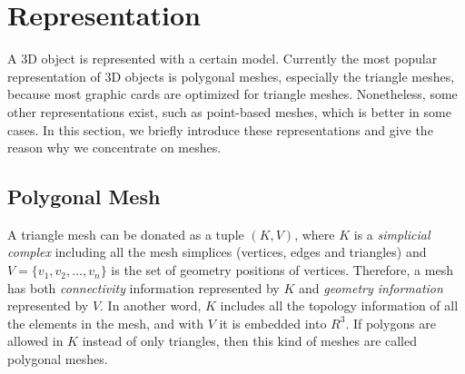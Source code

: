 \documentclass[11pt, a4paper]{report}
\begin{document}
    \section{Representation}
    \label{s:intro:representation}
    A 3D object is represented with a certain model.
    Currently the most popular representation of 3D objects is polygonal meshes, 
    especially the triangle meshes, because most graphic cards are optimized for triangle meshes. 
    Nonetheless, some other representations exist, 
    such as point-based meshes, which is better in some cases.
    In this section, we briefly introduce these representations and give the reason
    why we concentrate on meshes.
    \subsection{Polygonal Mesh}
    A triangle mesh can be donated as a tuple $(K, V)$, where $K$ is a
    \emph{simplicial complex} including all the mesh simplices 
    (vertices, edges and triangles) and $V =\{v_{1}, v_{2}, ...,
    v_{n}\}$ is the set of geometry positions of vertices. Therefore,
    a mesh has both \emph{connectivity} information represented by $K$
    and \emph{geometry information} represented by $V$. In another
    word, $K$ includes all the topology information of all the
    elements in the mesh, and with $V$ it is embedded into $R^{3}$. If
    polygons are allowed in $K$ instead of only triangles, then this
    kind of meshes are called polygonal meshes.
\end{document}
